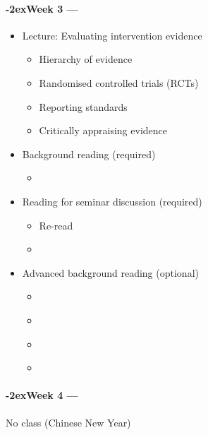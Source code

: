 \documentclass[a4paper, 11pt]{article}
\newcommand{\week}[1]{%
  \paragraph*{\kern-2ex\quad #1 --- \syldate{\today}}%


  \ifdim\wd1=\wd\MONDAY
    \AdvanceDate[7]
  \else
    \AdvanceDate[7]
  \fi
}
\begin{document}
\week{Week 3} 
\begin{itemize}
\item Lecture: Evaluating intervention evidence
	\begin{itemize}
	\item Hierarchy of evidence
	\item Randomised controlled trials (RCTs)
	\item Reporting standards
	\item Critically appraising evidence
	\end{itemize}
\item Background reading (required)
	\begin{itemize}
	\item \citet[chapter 6]{Dollaghan2007a}
	\end{itemize}
\item Reading for seminar discussion (required)
	\begin{itemize}
	\item Re-read \citet{Jones2005}
	\item \citet{Ward2017} %
	\end{itemize}
\item Advanced background reading (optional)
	\begin{itemize}
	\item \citet[pp. 59--65]{Haynes2006}
	\item \citet[pp. 67--77]{Straus2011}
	\item \citet[pp. 58--58, 122--145]{Ajetunmobi2002}
	\item \citet{Glasziou2004}
	\end{itemize}
\end{itemize}

\week{Week 4} No class (Chinese New Year)
\end{document}
